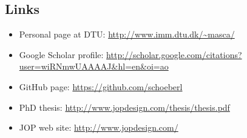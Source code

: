 \documentclass[%
    a4paper,
    11pt, %
    headinclude, footexclude,
    notitlepage,
    headsepline,
    pointlessnumbers,
    ]{scrartcl}
\begin{document}
\subsection*{Links}

\begin{itemize}
  \item Personal page at DTU:
      \url{http://www.imm.dtu.dk/~masca/}
  \item Google Scholar profile:
\url{http://scholar.google.com/citations?user=wiRNmwUAAAAJ&hl=en&oi=ao}
  \item GitHub page: \url{https://github.com/schoeberl}
  \item PhD thesis:
      \url{http://www.jopdesign.com/thesis/thesis.pdf}
  \item JOP web site: \url{http://www.jopdesign.com/}
\end{itemize}


%

\end{document}
